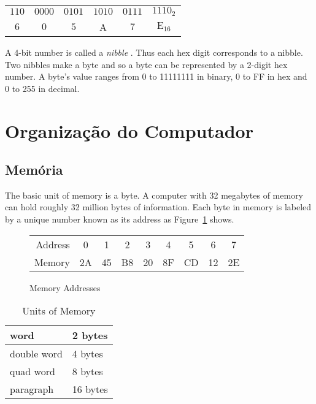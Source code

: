 \begin{tabular}{cccccc}
$110$ & $0000$ & $0101$ & $1010$ & $0111$ & $1110_2$ \\
  $6$ & $0$    &   $5$  &   A  &  $7$   &    $\mathrm{E}_{16}$ \\
\end{tabular}\newline

A 4-bit number is called a \emph{nibble} . Thus each hex
digit corresponds to a nibble. Two nibbles make a byte and so a byte
can be represented by a 2-digit hex number. A byte's value ranges from
0 to 11111111 in binary, 0 to FF in hex and 0 to 255 in decimal.

\section{Organização do Computador}

\subsection{Memória}

The basic unit of memory is a byte.  A computer with 32 megabytes of memory can hold roughly 32
million bytes of information. Each byte in memory is labeled by a
unique number known as its address as Figure~\ref{fig:memory} shows.

\begin{figure}[ht]
\begin{center}
\begin{tabular}{rcccccccc}
Address & 0 & 1 & 2 & 3 & 4 & 5 & 6 & 7 \\
\cline{2-9}
Memory & \multicolumn{1}{|c}{2A}  & \multicolumn{1}{|c}{45}
       & \multicolumn{1}{|c}{B8} & \multicolumn{1}{|c}{20}
       & \multicolumn{1}{|c}{8F} & \multicolumn{1}{|c}{CD}
       & \multicolumn{1}{|c}{12} & \multicolumn{1}{|c|}{2E} \\
\cline{2-9}
\end{tabular}
\caption{ Memory Addresses \label{fig:memory} }
\end{center}
\end{figure}

\begin{table}
\begin{center}
\begin{tabular}{|l|l|}
\hline
word & 2 bytes \\ \hline
double word & 4 bytes \\ \hline
quad word & 8 bytes \\ \hline
paragraph & 16 bytes \\ \hline
\end{tabular}
\caption{ Units of Memory \label{tab:mem_units} }
\end{center}
\end{table}

